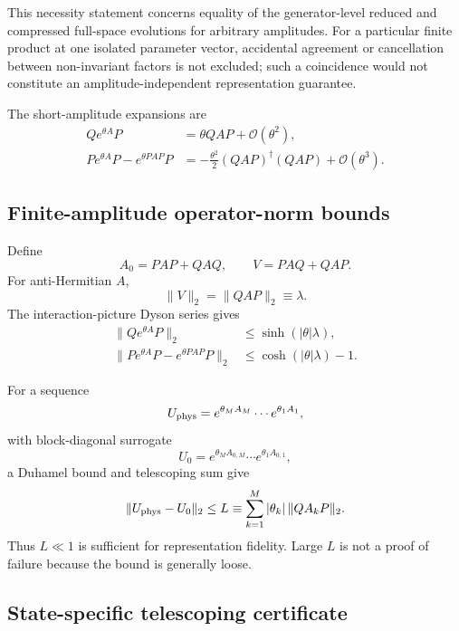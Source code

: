 \documentclass[
 aip,
 jcp,
 amsmath,amssymb,
 preprint
]{revtex4-2}
\begin{document}
This necessity statement concerns equality of the generator-level reduced and compressed full-space evolutions for arbitrary amplitudes.
For a particular finite product at one isolated parameter vector, accidental agreement or cancellation between non-invariant factors is not excluded; such a coincidence would not constitute an amplitude-independent representation guarantee.

The short-amplitude expansions are
\begin{align}
Qe^{\theta A}P
&=
\theta QAP+\mathcal O(\theta^2),\\
Pe^{\theta A}P-e^{\theta PAP}P
&=
-\frac{\theta^2}{2}(QAP)^\dagger(QAP)
+\mathcal O(\theta^3).
\end{align}

\subsection{Finite-amplitude operator-norm bounds}

Define
\begin{equation}
A_0=PAP+QAQ,\qquad V=PAQ+QAP.
\end{equation}
For anti-Hermitian $A$,
\begin{equation}
\|V\|_2=\|QAP\|_2\equiv\lambda.
\end{equation}
The interaction-picture Dyson series gives
\begin{align}
\|Qe^{\theta A}P\|_2
&\le\sinh(|\theta|\lambda),\\
\|Pe^{\theta A}P-e^{\theta PAP}P\|_2
&\le\cosh(|\theta|\lambda)-1.
\end{align}

For a sequence
\begin{equation}
U_{\rm phys}=e^{\theta_MA_M}\cdots e^{\theta_1A_1},
\end{equation}
with block-diagonal surrogate
\begin{equation}
U_0=e^{\theta_MA_{0,M}}\cdots e^{\theta_1A_{0,1}},
\end{equation}
a Duhamel bound and telescoping sum give
\begin{equation}
\|U_{\rm phys}-U_0\|_2
\le
L
\equiv
\sum_{k=1}^{M}|\theta_k|\,\|QA_kP\|_2 .
\label{eq:L}
\end{equation}
Thus $L\ll1$ is sufficient for representation fidelity.
Large $L$ is not a proof of failure because the bound is generally loose.

\subsection{State-specific telescoping certificate}
\end{document}
